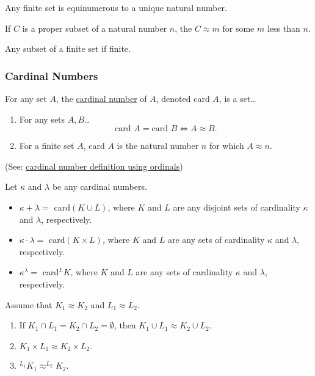 \begin{corollary}
Any finite set is equinumerous to a unique natural number.
\end{corollary}

\begin{lemma}
If $C$ is a proper subset of a natural number $n$, the $C \approx m$ for some $m$ less than $n$.
\end{lemma}

\begin{corollary}
Any subset of a finite set if finite.
\end{corollary}

\subsubsection{Cardinal Numbers}\label{cardinalnumbers}

For any set $A$, the \hyperref[ordinalnumbers]{cardinal number} of $A$, denoted card $A$, is a set\dots
\begin{enumerate}
  \item For any sets $A,B$\dots
  	$$\textrm{card } A = \textrm{card }B \Leftrightarrow A \approx B.$$
  \item For a finite set $A$, card $A$ is the natural number $n$ for which $A \approx n$.
\end{enumerate}

(See: \hyperref[cardinalnumberdefinition]{cardinal number definition using ordinals})

Let $\kappa$ and $\lambda$ be any cardinal numbers.
\begin{itemize}
  \item $\kappa + \lambda =$ card$(K \cup L)$, where $K$ and $L$ are any disjoint sets of cardinality $\kappa$ and $\lambda$, respectively.
  \item $\kappa \cdot \lambda =$ card$(K \times L)$, where $K$ and $L$ are any sets of cardinality $\kappa$ and $\lambda$, respectively.
  \item $\kappa^{\lambda} =$ card$^LK$, where $K$ and $L$ are any sets of cardinality $\kappa$ and $\lambda$, respectively.
\end{itemize}

\begin{proposition}
Assume that $K_1 \approx K_2$ and $L_1 \approx L_2$.
\begin{enumerate}
  \item If $K_1 \cap L_1 = K_2 \cap L_2 = \emptyset$, then $K_1 \cup L_1 \approx K_2 \cup L_2$.
  \item $K_1 \times L_1 \approx K_2 \times L_2.$
  \item $^{L_1}K_1 \approx ^{L_2}K_2.$
\end{enumerate}
\end{proposition}

